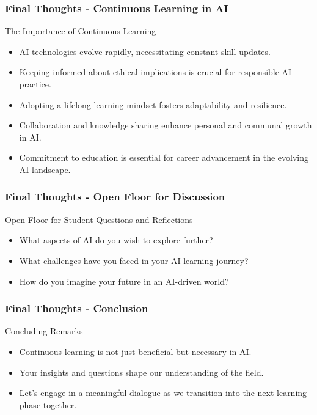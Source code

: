 \documentclass[aspectratio=169]{beamer}
\begin{document}
\begin{frame}[fragile]
    \frametitle{Final Thoughts - Continuous Learning in AI}
    \begin{block}{The Importance of Continuous Learning}
        \begin{itemize}
            \item AI technologies evolve rapidly, necessitating constant skill updates.
            \item Keeping informed about ethical implications is crucial for responsible AI practice.
            \item Adopting a lifelong learning mindset fosters adaptability and resilience.
            \item Collaboration and knowledge sharing enhance personal and communal growth in AI.
            \item Commitment to education is essential for career advancement in the evolving AI landscape.
        \end{itemize}
    \end{block}
\end{frame}

\begin{frame}[fragile]
    \frametitle{Final Thoughts - Open Floor for Discussion}
    \begin{block}{Open Floor for Student Questions and Reflections}
        \begin{itemize}
            \item What aspects of AI do you wish to explore further?
            \item What challenges have you faced in your AI learning journey?
            \item How do you imagine your future in an AI-driven world?
        \end{itemize}
    \end{block}
\end{frame}

\begin{frame}[fragile]
    \frametitle{Final Thoughts - Conclusion}
    \begin{block}{Concluding Remarks}
        \begin{itemize}
            \item Continuous learning is not just beneficial but necessary in AI.
            \item Your insights and questions shape our understanding of the field.
            \item Let’s engage in a meaningful dialogue as we transition into the next learning phase together.
        \end{itemize}
    \end{block}
\end{frame}
\end{document}
